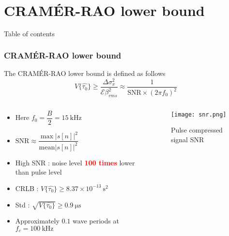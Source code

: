 \documentclass[UKenglish,8pt,aspectratio=1610]{beamer}
\begin{document}
\section{\textsc{CRAM\'{E}R-RAO} lower bound}

\begin{frame}{Table of contents}
	\tableofcontents[currentsection]
\end{frame}

\begin{frame}
	\frametitle{\textsc{CRAM\'{E}R-RAO} lower bound}
\begin{theorem}
	The \textsc{CRAM\'{E}R-RAO} lower bound is defined as follows
	\begin{equation}
		V\{\hat{\tau_0}\}\geq \dfrac{\Delta\sigma_{x}^2}{\mathcal{E}\beta_{rms}^2}\approx\dfrac{1}{\mathrm{SNR}\times (2\pi f_0)^2}
	\end{equation}
\end{theorem}



	\begin{columns}
	\begin{column}{0.5\textwidth}
	\begin{itemize}
		\item Here $f_0=\dfrac{B}{2}=15~\si{\kilo\hertz}$
		\item $\mathrm{SNR}\approx\dfrac{\max \lvert s[n]\rvert^2}{\textrm{mean}\lvert s[n]\rvert^2}$ 
		\item High SNR : noise level \textcolor{red}{\textbf{100 times}} lower than pulse level
		\item CRLB : $V\{\hat{\tau_0}\}\geq 8.37\times 10^{-13}~\si{\second^2}$
		\item Std : $\sqrt{V\{\hat{\tau_0}\}}\geq 0.9~\si{\micro\second}$
		\item Approximately $0.1$ wave periods at $f_c=100~\si{\kilo\hertz}$
	\end{itemize}
	\end{column}
	\begin{column}{0.5\textwidth}
			\vspace{-25pt}
	\begin{figure}[h!]
		\texttt{[image: snr.png]}
		\centering
		\caption{Pulse compressed signal SNR}
	\end{figure}
	\end{column}
\end{columns} 

\end{frame}
\end{document}
